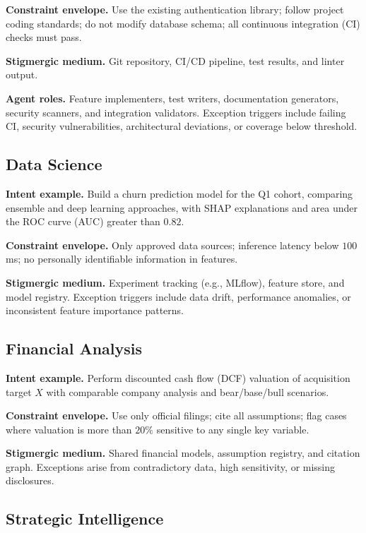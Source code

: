 \documentclass[11pt]{article}
\begin{document}
\textbf{Constraint envelope.} Use the existing authentication library; follow project coding standards; do not modify database schema; all continuous integration (CI) checks must pass.

\textbf{Stigmergic medium.} Git repository, CI/CD pipeline, test results, and linter output.

\textbf{Agent roles.} Feature implementers, test writers, documentation generators, security scanners, and integration validators. Exception triggers include failing CI, security vulnerabilities, architectural deviations, or coverage below threshold.

\subsection{Data Science}

\textbf{Intent example.} Build a churn prediction model for the Q1 cohort, comparing ensemble and deep learning approaches, with SHAP explanations and area under the ROC curve (AUC) greater than $0.82$.

\textbf{Constraint envelope.} Only approved data sources; inference latency below $100$ ms; no personally identifiable information in features.

\textbf{Stigmergic medium.} Experiment tracking (e.g., MLflow), feature store, and model registry. Exception triggers include data drift, performance anomalies, or inconsistent feature importance patterns.

\subsection{Financial Analysis}

\textbf{Intent example.} Perform discounted cash flow (DCF) valuation of acquisition target $X$ with comparable company analysis and bear/base/bull scenarios.

\textbf{Constraint envelope.} Use only official filings; cite all assumptions; flag cases where valuation is more than $20\%$ sensitive to any single key variable.

\textbf{Stigmergic medium.} Shared financial models, assumption registry, and citation graph. Exceptions arise from contradictory data, high sensitivity, or missing disclosures.

\subsection{Strategic Intelligence}
\end{document}
